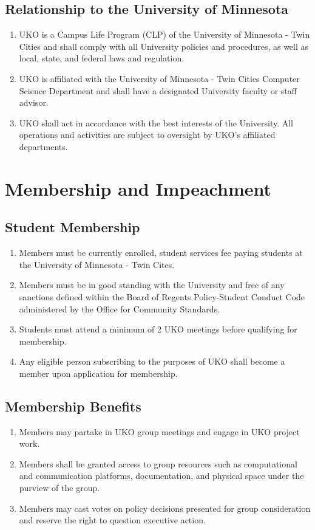 \documentclass[12pt,executivepaper]{article}
\begin{document}
\subsection{Relationship to the University of Minnesota}
\begin{enumerate}
    \item UKO is a Campus Life Program (CLP) of the University of Minnesota -
          Twin Cities and shall comply with all University policies and
          procedures, as well as local, state, and federal laws and regulation.
    \item UKO is affiliated with the University of Minnesota - Twin Cities
          Computer Science Department and shall have a designated University
          faculty or staff advisor.
    \item UKO shall act in accordance with the best interests of the
          University. All operations and activities are subject to oversight
          by UKO's affiliated departments.
\end{enumerate}

\section{Membership and Impeachment}

\subsection{Student Membership}
\begin{enumerate}
    \item Members must be currently enrolled, student services fee paying
          students at the University of Minnesota - Twin Cites.
    \item Members must be in good standing with the University and free of any
          sanctions defined within the Board of Regents Policy-Student Conduct
          Code administered by the Office for Community Standards.
    \item Students must attend a minimum of 2 UKO meetings before qualifying
          for membership.
    \item Any eligible person subscribing to the purposes of UKO shall become a
          member upon application for membership.
\end{enumerate}

\subsection{Membership Benefits}
\begin{enumerate}
    \item Members may partake in UKO group meetings and engage in UKO project
          work.
    \item Members shall be granted access to group resources such as
          computational and communication platforms, documentation, and
          physical space under the purview of the group.
    \item Members may cast votes on policy decisions presented for group
          consideration and reserve the right to question executive action.
\end{enumerate}
\end{document}
